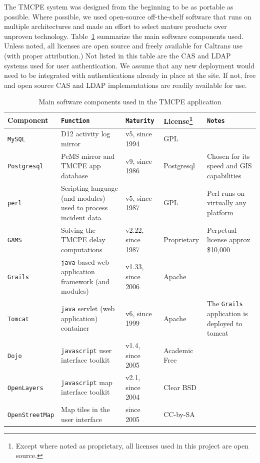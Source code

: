 \documentclass[12pt]{report}
\begin{document}
The \ac{TMCPE} system was designed from the beginning to be as portable as
possible.  Where possible, we used open-source off-the-shelf software that runs
on multiple architectures and made an effort to select mature products over
unproven technology.  Table~\ref{tab:software-components} summarize the main
software components used.  Unless noted, all licenses are open source and freely
available for Caltrans use (with proper attribution.)  Not listed in this table
are the \ac{CAS} and \ac{LDAP} systems used for user authentication.  We assume
that any new deployment would need to be integrated with authentications already
in place at the site.  If not, free and open source \ac{CAS} and \ac{LDAP}
implementations are readily available for use.
\begin{table}
  \centering
  \footnotesize
  \begin{tabularx}{\textwidth}{llllX}
    \hline
    \textbf{Component} & \texttt{Function} & \texttt{Maturity} & License\footnote{Except where noted as proprietary, all licenses used in this project are open source.} & \texttt{Notes} \\
    \hline
    \texttt{MySQL} & \ac{D12} activity log mirror &  v5, since 1994 & GPL & ~ \\
    \texttt{Postgresql} & \ac{PeMS} mirror and \ac{TMCPE} app database & v9, since 1986 & Postgresql & Chosen for its speed and \acs{GIS} capabilities\\
    \texttt{perl} & Scripting language (and modules) used to process incident data & v5, since 1987 & GPL & Perl runs on virtually any platform \\
    \texttt{GAMS} & Solving the \ac{TMCPE} delay computations & v2.22, since 1987 & Proprietary & Perpetual license approx \$10,000 \\
    \texttt{Grails} & \texttt{java}-based web application framework (and modules) & v1.33, since 2006 & Apache & ~ \\
    \texttt{Tomcat} & \texttt{java} servlet (web application) container & v6, since 1999 & Apache & The \texttt{Grails} application is deployed to tomcat \\
    \texttt{Dojo} & \texttt{javascript} user interface toolkit & v1.4, since 2005 & Academic Free & ~ \\
    \texttt{OpenLayers} & \texttt{javascript} map interface toolkit & v2.1, since 2004 & Clear BSD & ~ \\
    \texttt{OpenStreetMap} & Map tiles in the user interface & since 2005 & CC-by-SA & ~ \\
    \hline
  \end{tabularx}
  \caption{Main software components used in the TMCPE application}
  \label{tab:software-components}
\end{table}
\end{document}
